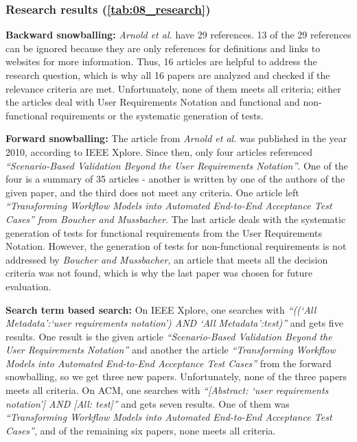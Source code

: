 \subsubsection{Research results (\autoref{tab:08_research})}

\textbf{Backward snowballing:} \textit{Arnold et al.} have 29 references. 13 of the 29 references can be ignored because they are only references for definitions and links to websites for more information. Thus, 16 articles are helpful to address the research question, which is why all 16 papers are analyzed and checked if the relevance criteria are met. Unfortunately, none of them meets all criteria; either the articles deal with User Requirements Notation and functional and non-functional requirements or the systematic generation of tests. 

\textbf{Forward snowballing:} The article from \textit{Arnold et al.} was published in the year 2010, according to IEEE Xplore. Since then, only four articles referenced \textit{\enquote{Scenario-Based Validation Beyond the User Requirements Notation}}. One of the four is a summary of 35 articles - another is written by one of the authors of the given paper, and the third does not meet any criteria. One article left \textit{\enquote{Transforming Workflow Models into Automated End-to-End Acceptance Test Cases} from Boucher and Mussbacher}. The last article deals with the systematic generation of tests for functional requirements from the User Requirements Notation. However, the generation of tests for non-functional requirements is not addressed by \textit{Boucher and Mussbacher}, an article that meets all the decision criteria was not found, which is why the last paper was chosen for future evaluation.

\textbf{Search term based search:} On IEEE Xplore, one searches with \textit{\enquote{((\enquote{All Metadata}:\enquote{user requirements notation}) AND \enquote{All Metadata}:test)}} and gets five results. One result is the given article \textit{\enquote{Scenario-Based Validation Beyond the User Requirements Notation}} and another the article \textit{\enquote{Transforming Workflow Models into Automated End-to-End Acceptance Test Cases}} from the forward snowballing, so we get three new papers. Unfortunately, none of the three papers meets all criteria. On ACM, one searches with \textit{\enquote{[Abstract: \enquote{user requirements notation}] AND [All: test]}} and gets seven results. One of them was \textit{\enquote{Transforming Workflow Models into Automated End-to-End Acceptance Test Cases}}, and of the remaining six papers, none meets all criteria.


